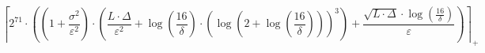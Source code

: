 \[\left\lceil 2^{71} \cdot \left(\left(1 + \frac{\sigma^{2}}{\varepsilon^{2}}\right) \cdot \left(\frac{L \cdot \Delta}{\varepsilon^{2}} + \log\left(\frac{16}{\delta}\right) \cdot \left(\log\left(2 + \log\left(\frac{16}{\delta}\right)\right)\right)^{3}\right) + \frac{\sqrt{L \cdot \Delta} \cdot \log\left(\frac{16}{\delta}\right)}{\varepsilon}\right) \right\rceil_{+}\]
